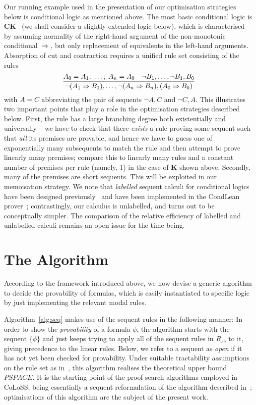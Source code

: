 \documentclass{entcs} \usepackage{entcsmacro}
\begin{document}
Our running example used in the presentation of our optimisation
strategies below is conditional logic as mentioned above. The most
basic conditional logic is $\textbf{CK}$~\cite{Chellas80} (we shall
consider a slightly extended logic below), which is characterised by
assuming normality of the right-hand argument of the non-monotonic
conditional $\Rightarrow$, but only replacement of equivalents in the
left-hand arguments. Absorption of cut and contraction requires a
unified rule set consisting of the rules
\begin{equation*}
  \frac{A_0=A_1;\;\dots;\; A_n=A_0\quad \neg B_1,\dots,\neg B_1,B_0}{\neg(A_1\Rightarrow B_1),\dots,\neg(A_n\Rightarrow B_n),(A_0\Rightarrow B_0)}
\end{equation*}
with $A=C$ abbreviating the pair of sequents $\neg A,C$ and $\neg
C,A$.  This illustrates two important points that play a role in the
optimisation strategies described below. First, the rule has a large
branching degree both existentially and universally -- we have to
check that there \emph{exists} a rule proving some sequent such that
\emph{all} its premises are provable, and hence we have to guess one
of exponentially many subsequents to match the rule and then attempt
to prove linearly many premises; compare this to linearly many rules
and a constant number of premises per rule (namely, $1$) in the case
of $\textbf{K}$ shown above. Secondly, many of the premises are short
sequents. This will be exploited in our memoisation strategy. We note
that \emph{labelled} sequent calculi for conditional logics have been
designed previously~\cite{OlivettiEA07} and have been implemented in
the CondLean prover~\cite{OlivettiPozzato03}; contrastingly, our
calculus is unlabelled, and turns out to be conceptually simpler. The
comparison of the relative efficiency of labelled and unlabelled
calculi remains an open issue for the time being.

\section{The Algorithm}

According to the framework introduced above, we now devise a generic
algorithm to decide the provability of formulas, which is easily
instantiated to specific logic by just implementing the relevant modal
rules.


Algorithm~\ref{alg:seq} makes use of the sequent rules in the
following manner: In order to show the \emph{provability} of a formula
$\phi$, the algorithm starts with the sequent $\{\phi\}$ and just
keeps trying to apply all of the sequent rules in $R_{sc}$ to it,
giving precedence to the linear rules.  Below, we refer to a sequent
as \emph{open} if it has not yet been checked for provability. Under
suitable tractability assumptions on the rule set as
in~\cite{SchroderPattinson09,PattinsonSchroder08b}, this algorithm
realises the theoretical upper bound $\mathit{PSPACE}$. It is the
starting point of the proof search algorithms employed in CoLoSS,
being essentially a sequent reformulation of the algorithm described
in~\cite{CalinEA09}; optimisations of this algorithm are the subject
of the present work. 
\end{document}
